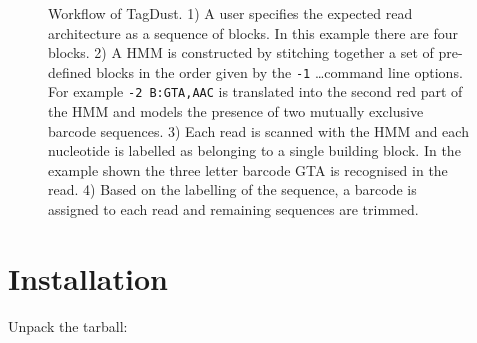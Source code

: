 \documentclass[11pt,a4paper,oneside]{book}
\begin{document}
\begin{figure}[H]
\begin{center}




  
\end{center}
\caption{Workflow of TagDust. 1) A user specifies the expected read architecture as a sequence of blocks. In this example there are four blocks. 2) A HMM is constructed by stitching together a set of pre-defined blocks in the order given by the {\tt -1} \dots command line options. For example {\tt -2 B:GTA,AAC} is translated into the second red part of the HMM and models the presence of two mutually exclusive barcode sequences. 3) Each read is scanned with the HMM and each nucleotide is labelled as belonging to a single building block. In the example shown the three letter barcode GTA is recognised in the read. 4) Based on the labelling of the sequence, a barcode is assigned to each read and remaining sequences are trimmed.}
\label{figure1}
\end{figure}



\newpage

\chapter{Installation}


Unpack the tarball:
\end{document}
